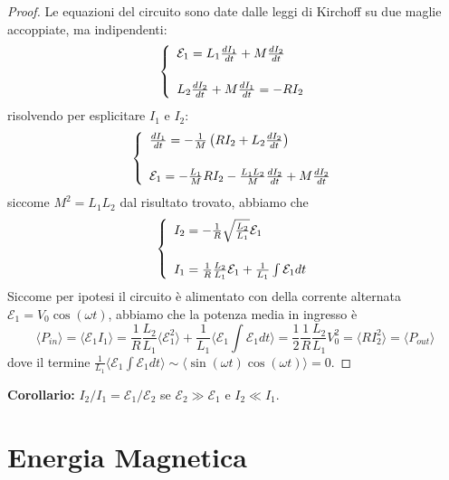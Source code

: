 \begin{proof}
Le equazioni del circuito sono date dalle leggi di Kirchoff su due maglie accoppiate, ma indipendenti:
\begin{equation*}
\left \{ \begin{array}{l}
	 \mathcal{E}_1 =  L_1 \frac{d I_1}{dt} + M \frac{d I_2}{dt} \\ \rule{0pt}{25pt}
	L_2 \frac{d I_2}{dt} + M \frac{d I_1}{dt} = -RI_2
	\end{array}\right .
\end{equation*}
risolvendo per esplicitare  $I_1$ e $I_2$:
\begin{equation*}
\left \{ \begin{array}{l}
	\frac{d I_1}{dt} = - \frac{1}{M} \left( RI_2 + L_2 \frac{dI_2}{dt}\right) \\ \rule{0pt}{25pt}
	\mathcal{E}_1 = - \frac{L_1}{M}R I_2 - \frac{L_1 L_2}{M} \frac{d I_2}{dt} + M \frac{d I_2}{dt}
\end{array}\right.
\end{equation*} 
siccome $M^2 = L_1 L_2$ dal risultato trovato, abbiamo che 
\begin{equation*}
	\left \{ \begin{array}{l}
		I_2 = - \frac{1}{R} \sqrt{\frac{L_2}{L_1}}\mathcal{E}_1 \\ \rule{0pt}{25pt}
		I_1 =  \frac{1}{R}\frac{L_2}{L_1} \mathcal{E}_1 + \frac{1}{L_1} \int \mathcal{E}_1 dt
	\end{array}\right .
\end{equation*}
Siccome per ipotesi il circuito \`e alimentato con della corrente alternata $\mathcal{E}_1 = V_0 \cos(\omega t)$, abbiamo che la potenza media in ingresso \`e 
\begin{equation*}
	\langle P_{in}\rangle = \langle \mathcal{E}_1 I_1 \rangle = \frac{1}{R} \frac{L_2}{L_1} \langle \mathcal{E}_1^2 \rangle + \frac{1}{L_1} \langle \mathcal{E}_1 \int \mathcal{E}_1 dt \rangle = \frac{1}{2} \frac{1}{R}\frac{L_2}{L_1}V_0 ^2 = \langle R I_2^2 \rangle  = \langle P_{out} \rangle
\end{equation*}
dove il termine $\frac{1}{L_1} \langle \mathcal{E}_1 \int \mathcal{E}_1 dt \rangle \sim \langle \sin(\omega t) \cos(\omega t) \rangle = 0$.

\end{proof}

\textbf{Corollario:} $I_2/I_1 = \mathcal{E}_{1} / \mathcal{E}_2$ se $\mathcal{E}_2 \gg \mathcal{E}_1$ e $I_2 \ll I_1$.

\section{Energia Magnetica}

